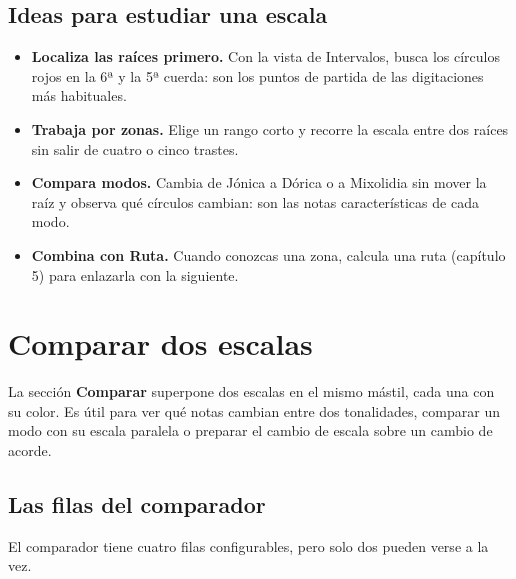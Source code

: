 \documentclass[a4paper,11pt,oneside]{report}
\providecommand{\tightlist}{\setlength{\itemsep}{2pt}\setlength{\parskip}{0pt}}
\begin{document}
\Needspace{3.5cm}
\section{Ideas para estudiar una escala}\label{ideas-para-estudiar-una-escala}

\begin{itemize}
\tightlist
\item
  \textbf{Localiza las raíces primero.} Con la vista de Intervalos, busca los círculos rojos en la 6ª y la 5ª cuerda: son los puntos de partida de las digitaciones más habituales.
\item
  \textbf{Trabaja por zonas.} Elige un rango corto y recorre la escala entre dos raíces sin salir de cuatro o cinco trastes.
\item
  \textbf{Compara modos.} Cambia de Jónica a Dórica o a Mixolidia sin mover la raíz y observa qué círculos cambian: son las notas características de cada modo.
\item
  \textbf{Combina con Ruta.} Cuando conozcas una zona, calcula una ruta (capítulo 5) para enlazarla con la siguiente.
\end{itemize}

\chapter{Comparar dos escalas}\label{comparar-dos-escalas}

La sección \textbf{Comparar} superpone dos escalas en el mismo mástil, cada una con su color. Es útil para ver qué notas cambian entre dos tonalidades, comparar un modo con su escala paralela o preparar el cambio de escala sobre un cambio de acorde.

\Needspace{3.5cm}
\section{Las filas del comparador}\label{las-filas-del-comparador}

El comparador tiene cuatro filas configurables, pero solo dos pueden verse a la vez.
\end{document}
